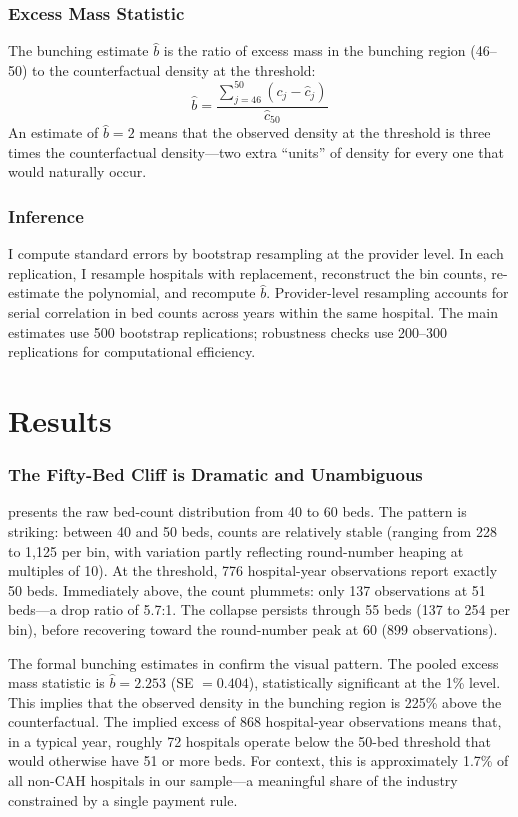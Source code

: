 \documentclass[12pt]{article}
\begin{document}
\subsubsection*{Excess Mass Statistic} The bunching estimate $\hat{b}$ is the ratio of excess mass in the bunching region (46--50) to the counterfactual density at the threshold:
\begin{equation}
\hat{b} = \frac{\sum_{j=46}^{50} (c_j - \hat{c}_j)}{\hat{c}_{50}}
\end{equation}
An estimate of $\hat{b} = 2$ means that the observed density at the threshold is three times the counterfactual density---two extra ``units'' of density for every one that would naturally occur.

\subsubsection*{Inference} I compute standard errors by bootstrap resampling at the provider level. In each replication, I resample hospitals with replacement, reconstruct the bin counts, re-estimate the polynomial, and recompute $\hat{b}$. Provider-level resampling accounts for serial correlation in bed counts across years within the same hospital. The main estimates use 500 bootstrap replications; robustness checks use 200--300 replications for computational efficiency.

\section{Results}\label{sec:results}

\subsubsection*{The Fifty-Bed Cliff is Dramatic and Unambiguous}  presents the raw bed-count distribution from 40 to 60 beds. The pattern is striking: between 40 and 50 beds, counts are relatively stable (ranging from 228 to 1,125 per bin, with variation partly reflecting round-number heaping at multiples of 10). At the threshold, 776 hospital-year observations report exactly 50 beds. Immediately above, the count plummets: only 137 observations at 51 beds---a drop ratio of 5.7:1. The collapse persists through 55 beds (137 to 254 per bin), before recovering toward the round-number peak at 60 (899 observations).



The formal bunching estimates in  confirm the visual pattern. The pooled excess mass statistic is $\hat{b} = 2.253$ (SE $= 0.404$), statistically significant at the 1\% level. This implies that the observed density in the bunching region is 225\% above the counterfactual. The implied excess of 868 hospital-year observations means that, in a typical year, roughly 72 hospitals operate below the 50-bed threshold that would otherwise have 51 or more beds. For context, this is approximately 1.7\% of all non-CAH hospitals in our sample---a meaningful share of the industry constrained by a single payment rule.
\end{document}
